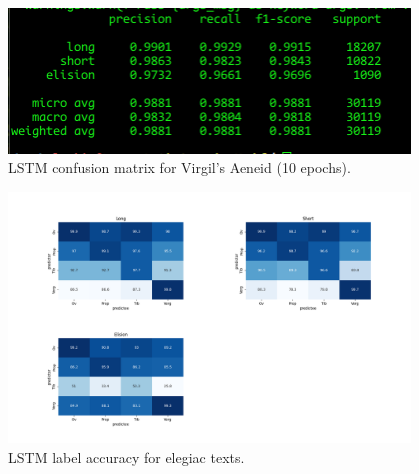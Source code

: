 \begin{figure}[H]
    \centering
    \includegraphics[width=0.95\textwidth]{img/lstm/lstm_confusion_matrix.png}

    \caption{LSTM confusion matrix for Virgil's Aeneid (10 epochs).}
    \label{fig:exp_architecture}
\end{figure}

\begin{figure}[H]
    \centering
    \includegraphics[width=0.95\textwidth]{img/lstm/lstm_label_accuracy_elegiac.png}

    \caption{LSTM label accuracy for elegiac texts.}
    \label{fig:exp_elegiac}
\end{figure}




